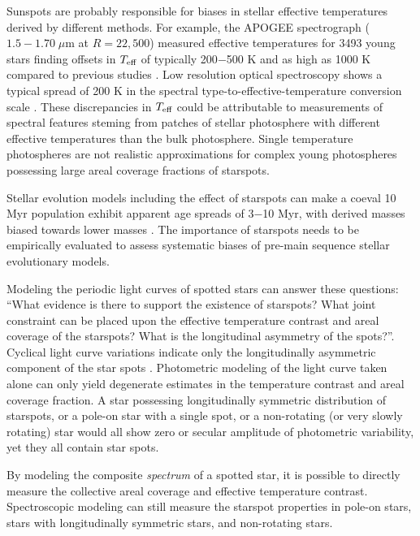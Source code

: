 \documentclass[onecolumn]{emulateapj}%
\begin{document}
Sunspots are probably responsible for biases in stellar effective temperatures derived by different methods.  For example, the APOGEE spectrograph ($1.5-1.70 \;\mu$m at $R=22,500$) measured effective temperatures for 3493 young stars finding offsets in $T_\textrm{eff}$ of typically 200$-$500 K and as high as 1000 K compared to previous studies \citep{2014ApJ...794..125C}.  Low resolution optical spectroscopy shows a typical spread of 200 K in the spectral type-to-effective-temperature conversion scale \citep{2014ApJ...786...97H}.  These discrepancies in $T_\textrm{eff}$ could be attributable to measurements of spectral features steming from patches of stellar photosphere with different effective temperatures than the bulk photosphere.  Single temperature photospheres are not realistic approximations for complex young photospheres possessing large areal coverage fractions of starspots.


Stellar evolution models including the effect of starspots can make a coeval 10 Myr population exhibit apparent age spreads of 3$-$10 Myr, with derived masses biased towards lower masses \citep{2015ApJ...807..174S}.  The importance of starspots needs to be empirically evaluated to assess systematic biases of pre-main sequence stellar evolutionary models.

Modeling the periodic light curves of spotted stars can answer these questions: ``What evidence is there to support the existence of starspots?  What joint constraint can be placed upon the effective temperature contrast and areal coverage of the starspots?  What is the longitudinal asymmetry of the spots?''.  Cyclical light curve variations indicate only the longitudinally asymmetric component of the star spots \citep{2012AJ....143....4H}.  Photometric modeling of the light curve taken alone can only yield degenerate estimates in the temperature contrast and areal coverage fraction.  A star possessing longitudinally symmetric distribution of starspots, or a pole-on star with a single spot, or a non-rotating (or very slowly rotating) star would all show zero or secular amplitude of photometric variability, yet they all contain star spots.  

By modeling the composite \emph{spectrum} of a spotted star, it is possible to directly measure the collective areal coverage and effective temperature contrast.  Spectroscopic modeling can still measure the starspot properties in pole-on stars, stars with longitudinally symmetric stars, and non-rotating stars.

\end{document}
